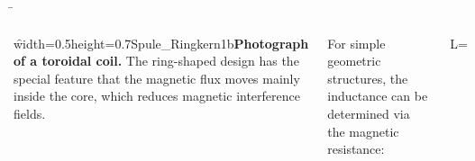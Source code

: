 \begin{frame} 
	\b{\begin{columns}
		\f{width=0.5\textwidth}{height=0.7\textheight}{Spule_Ringkern1b}{{\bf Photograph of a toroidal coil.} The ring-shaped design has the special feature that the magnetic flux moves mainly inside the core, which reduces magnetic interference fields.}

	{\vspace{0pt}}%
	For simple geometric structures, the inductance can be determined via the magnetic resistance:
	{\vspace{1,5cm}}
	\begin{eq}
		L= \label{InduktivitaetFormel3}
	\end{eq}
	\end{columns}}
\end{frame}

